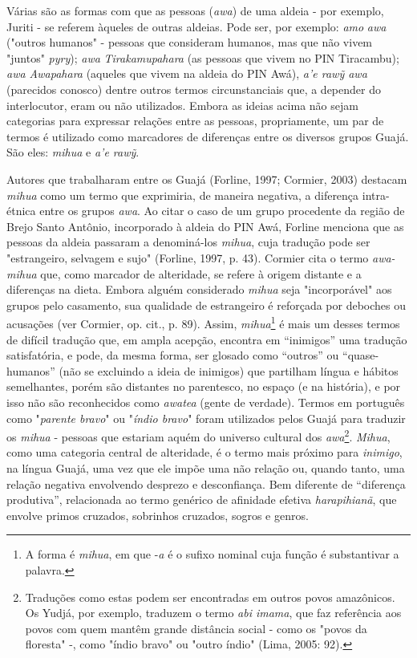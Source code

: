 Várias são as formas com que as pessoas (\emph{awa}) de uma aldeia - por
exemplo, Juriti - se referem àqueles de outras aldeias. Pode ser, por
exemplo: \emph{amo} \emph{awa} ("outros humanos" - pessoas que
consideram humanos, mas que não vivem "juntos" \emph{pyry}); \emph{awa}
\emph{Tirakamupahara} (as pessoas que vivem no PIN Tiracambu); \emph{awa
Awapahara} (aqueles que vivem na aldeia do PIN Awá), \emph{a'e rawỹ awa}
(parecidos conosco) dentre outros termos circunstanciais que, a depender
do interlocutor, eram ou não utilizados. Embora as ideias acima não
sejam categorias para expressar relações entre as pessoas, propriamente,
um par de termos é utilizado como marcadores de diferenças entre os
diversos grupos Guajá. São eles: \emph{mihua} e \emph{a'e rawỹ}.

Autores que trabalharam entre os Guajá (Forline, 1997; Cormier, 2003)
destacam \emph{mihua} como um termo que exprimiria, de maneira negativa,
a diferença intra-étnica entre os grupos \emph{awa}. Ao citar o caso de
um grupo procedente da região de Brejo Santo Antônio, incorporado à
aldeia do PIN Awá, Forline menciona que as pessoas da aldeia passaram a
denominá-los \emph{mihua}, cuja tradução pode ser "estrangeiro, selvagem
e sujo" (Forline, 1997, p. 43). Cormier cita o termo \emph{awa-mihua}
que, como marcador de alteridade, se refere à origem distante e a
diferenças na dieta. Embora alguém considerado \emph{mihua} seja
"incorporável" aos grupos pelo casamento, sua qualidade de estrangeiro é
reforçada por deboches ou acusações (ver Cormier, op. cit., p. 89).
Assim, \emph{mihua}\footnote{A forma é \emph{mihua}, em que -\emph{a} é
  o sufixo nominal cuja função é substantivar a palavra.} é mais um
desses termos de difícil tradução que, em ampla acepção, encontra em
``inimigos'' uma tradução satisfatória, e pode, da mesma forma, ser
glosado como ``outros'' ou ``quase-humanos'' (não se excluindo a ideia
de inimigos) que partilham língua e hábitos semelhantes, porém são
distantes no parentesco, no espaço (e na história), e por isso não são
reconhecidos como \emph{awatea} (gente de verdade). Termos em português
como "\emph{parente bravo}" ou "\emph{índio bravo}" foram utilizados
pelos Guajá para traduzir os \emph{mihua} - pessoas que estariam aquém
do universo cultural dos \emph{awa}\footnote{Traduções como estas podem
  ser encontradas em outros povos amazônicos. Os Yudjá, por exemplo,
  traduzem o termo \emph{abi imama}, que faz referência aos povos com
  quem mantêm grande distância social - como os "povos da floresta" -,
  como "índio bravo" ou "outro índio" (Lima, 2005: 92).}. \emph{Mihua},
como uma categoria central de alteridade, é o termo mais próximo para
\emph{inimigo}, na língua Guajá, uma vez que ele impõe uma não relação
ou, quando tanto, uma relação negativa envolvendo desprezo e
desconfiança. Bem diferente de ``diferença produtiva'', relacionada ao
termo genérico de afinidade efetiva \emph{harapihianã}, que envolve
primos cruzados, sobrinhos cruzados, sogros e genros.

